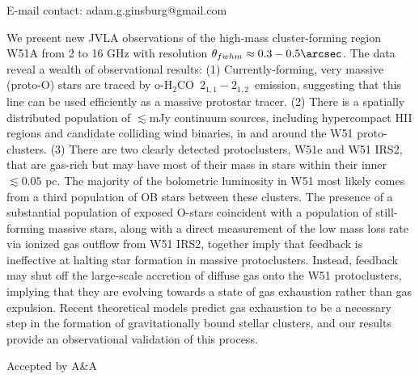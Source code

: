 \documentclass[]{article}
\newcommand{\ortho}{\ensuremath{\textrm{o-H}_2\textrm{CO}}\xspace}
\newcommand{\twotwo}{\ensuremath{2_{1,1}-2_{1,2}}\xspace}
\begin{document}

{E-mail contact: adam.g.ginsburg@gmail.com}





{
We present new JVLA observations of the high-mass cluster-forming region W51A
from 2 to 16 GHz with resolution
$\theta_{fwhm}\approx0.3-0.5\arcsec$.  The data reveal a wealth of
observational results:
(1) Currently-forming, very massive (proto-O) stars are traced by \ortho\ 
\twotwo\  emission, suggesting that this line can be used efficiently as a
massive protostar tracer.
(2) There is a spatially distributed population of $\lesssim$mJy continuum sources,
including hypercompact H{\sc II} regions and candidate colliding wind binaries,
in and around the W51 proto-clusters.  
(3) There are two clearly detected protoclusters, W51e and W51 IRS2, that are
gas-rich but may have most of their mass in stars within their inner $\lesssim0.05$
pc.  The
majority of the bolometric luminosity in W51 most likely comes from a third
population of OB stars between these clusters.
The presence of a substantial population of exposed O-stars coincident with
a population of still-forming massive stars, along with a direct measurement
of the low mass loss rate via ionized gas outflow from W51 IRS2, together imply
that feedback is ineffective at halting star formation in massive
protoclusters.  Instead, feedback may shut off the large-scale accretion of
diffuse gas onto the W51 protoclusters, implying that they are evolving towards
a state of gas exhaustion rather than gas expulsion. Recent theoretical models
predict gas exhaustion to be a necessary step in the formation of
gravitationally bound stellar clusters, and our results provide an
observational validation of this process.
}



{ Accepted by A\&A }

\end{document}
